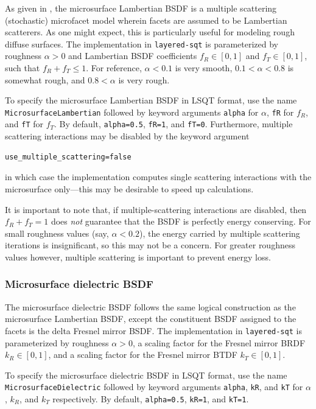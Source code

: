 \documentclass[
    twoside,
    twocolumn,
    letterpaper,
    10pt]{article}
\newcommand\namett[2]{{\color{code#1}\texttt{#2}}}
\begin{document}
As given in \cite{Heitz:16},
the microsurface Lambertian BSDF is a multiple scattering (stochastic)
microfacet model wherein facets are assumed to be Lambertian scatterers.
As one might expect, this is particularly useful for modeling rough diffuse 
surfaces. The implementation in \texttt{layered-sqt} is parameterized by
roughness $\alpha>0$ and Lambertian BSDF coefficients
$f_R \in [0,1]$ and $f_T \in [0,1]$, such that $f_R + f_T \le 1$.
For reference, $\alpha < 0.1$ is very smooth, 
$0.1 < \alpha < 0.8$ is somewhat rough, and $0.8 < \alpha$ is very rough.

To specify the microsurface Lambertian BSDF 
in LSQT format, use the name \namett{purple}{MicrosurfaceLambertian}
followed by keyword arguments \texttt{alpha} for $\alpha$,
\texttt{fR} for $f_R$, and \texttt{fT} for $f_T$. By default, 
\texttt{alpha=0.5}, \texttt{fR=1}, and \texttt{fT=0}. 
Furthermore, multiple scattering interactions may be disabled by the 
keyword argument
\begin{lstlisting}
use_multiple_scattering=false
\end{lstlisting}
in which case the implementation computes single 
scattering interactions with the microsurface only---this may be
desirable to speed up calculations.

It is 
important to note that, if multiple-scattering interactions are 
disabled, then $f_R + f_T = 1$ does \emph{not} guarantee that the BSDF 
is perfectly energy conserving. 
For small roughness values (say, $\alpha < 0.2$), the energy carried by 
multiple scattering iterations is insignificant, so this may not be a
concern. For greater roughness values however, multiple scattering is important
to prevent energy loss.

\subsubsection{Microsurface dielectric BSDF}
\label{sec:doc-layers-microsurface-dielectric}

The microsurface dielectric BSDF follows the same logical construction as 
the microsurface Lambertian BSDF, except the constituent BSDF assigned to the
facets is the delta Fresnel mirror BSDF. The implementation in 
\texttt{layered-sqt} is parameterized by roughness $\alpha > 0$, a scaling
factor for the Fresnel mirror BRDF $k_R \in [0, 1]$, and a scaling factor for 
the Fresnel mirror BTDF $k_T \in [0, 1]$.

To specify the microsurface dielectric BSDF 
in LSQT format, use the name
\namett{purple}{MicrosurfaceDielectric}
followed by keyword arguments \texttt{alpha}, \texttt{kR}, and
\texttt{kT} for $\alpha$, $k_R$, and $k_T$ respectively. By default, 
\texttt{alpha=0.5}, \texttt{kR=1}, and \texttt{kT=1}.
\end{document}
